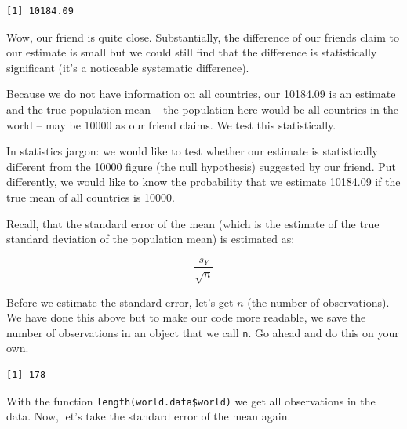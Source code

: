\documentclass[]{article}
\newenvironment{Shaded}{\begin{snugshade}}{\end{snugshade}}
\newcommand{\KeywordTok}[1]{\textcolor[rgb]{0.13,0.29,0.53}{\textbf{#1}}}
\newcommand{\StringTok}[1]{\textcolor[rgb]{0.31,0.60,0.02}{#1}}
\newcommand{\OperatorTok}[1]{\textcolor[rgb]{0.81,0.36,0.00}{\textbf{#1}}}
\newcommand{\NormalTok}[1]{#1}
\theoremstyle{definition}
\theoremstyle{definition}
\theoremstyle{definition}
\theoremstyle{remark}
\begin{document}
\begin{verbatim}
[1] 10184.09
\end{verbatim}

Wow, our friend is quite close. Substantially, the difference of our
friends claim to our estimate is small but we could still find that the
difference is statistically significant (it's a noticeable systematic
difference).

Because we do not have information on all countries, our 10184.09 is an
estimate and the true population mean -- the population here would be
all countries in the world -- may be 10000 as our friend claims. We test
this statistically.

In statistics jargon: we would like to test whether our estimate is
statistically different from the 10000 figure (the null hypothesis)
suggested by our friend. Put differently, we would like to know the
probability that we estimate 10184.09 if the true mean of all countries
is 10000.

Recall, that the standard error of the mean (which is the estimate of
the true standard deviation of the population mean) is estimated as:

\[ \frac{s_{Y}}{\sqrt{n}} \]

Before we estimate the standard error, let's get \(n\) (the number of
observations). We have done this above but to make our code more
readable, we save the number of observations in an object that we call
\texttt{n}. Go ahead and do this on your own.

\begin{Shaded}
\end{Shaded}

\begin{verbatim}
[1] 178
\end{verbatim}

With the function \texttt{length(world.data\$world)} we get all
observations in the data. Now, let's take the standard error of the mean
again.

\begin{Shaded}
\end{Shaded}
\end{document}
